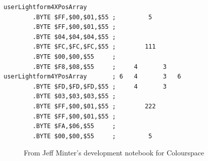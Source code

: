 \begin{minipage}[b]{0.48\linewidth}
\vspace{1cm}
\begin{lrbox}{\mybox}%
\hspace{1cm}
\begin{lstlisting}[basicstyle=\ttfamily\tiny,escapechar=\%]
userLightform4XPosArray
        .BYTE $FF,$00,$01,$55 ;         5        
        .BYTE $FF,$00,$01,$55 ;                  
        .BYTE $04,$04,$04,$55 ;                  
        .BYTE $FC,$FC,$FC,$55 ;        111       
        .BYTE $00,$00,$55     ;                  
        .BYTE $F8,$08,$55     ;     4       3    
userLightform4YPosArray       ; 6   4       3   6
        .BYTE $FD,$FD,$FD,$55 ;     4       3    
        .BYTE $03,$03,$03,$55 ;                  
        .BYTE $FF,$00,$01,$55 ;        222       
        .BYTE $FF,$00,$01,$55 ;                  
        .BYTE $FA,$06,$55     ;                  
        .BYTE $00,$00,$55     ;         5        
\end{lstlisting}
\end{lrbox}%
\scalebox{0.8}{\usebox{\mybox}}

\end{minipage}
%
\begin{figure}[H]
    \centering
    \begin{adjustbox}{width=13cm,center}
    \end{adjustbox}
\caption{From Jeff Minter's development notebook for Colourspace}
\end{figure}
